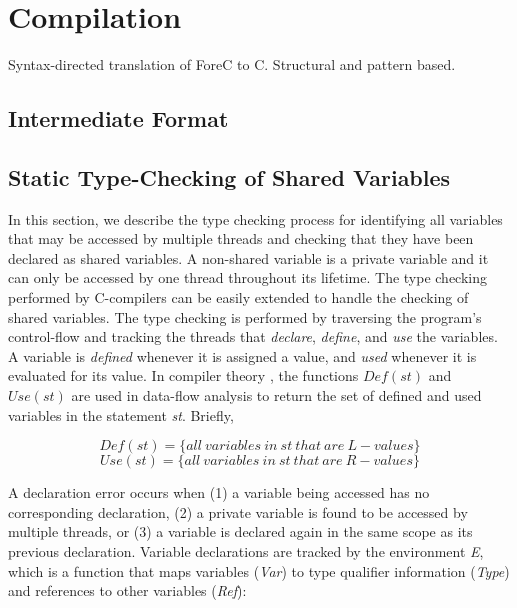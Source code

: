 \section{Compilation}
\label{sec:compilation}

Syntax-directed translation of ForeC to C. Structural and pattern based.

\subsection{Intermediate Format}

\subsection{Static Type-Checking of Shared Variables}
In this section, we describe the type checking process for identifying 
all variables that may be accessed by multiple threads and checking that 
they have been declared as shared variables. A non-shared variable is 
a private variable and it can only be accessed by one thread throughout 
its lifetime. The type checking performed by C-compilers can be easily 
extended to handle the checking of shared variables. The type checking 
is performed by traversing the program's control-flow and tracking the 
threads that \emph{declare}, \emph{define}, and \emph{use} the variables. 
A variable is \emph{defined} whenever it is assigned a value, and \emph{used} 
whenever it is evaluated for its value. In compiler theory \cite{compiler_def_use}, 
the functions $Def(st)$ and $Use(st)$ are used in data-flow analysis to 
return the set of defined and used variables in the statement \emph{st}. 
Briefly,

\begin{equation*}
	Def(st) = \{ all~variables~in~st~that~are~L-values \}
\end{equation*}
\begin{equation*}
	Use(st) = \{ all~variables~in~st~that~are~R-values \}
\end{equation*}

A declaration error occurs when (1) a variable being accessed has no 
corresponding declaration, (2) a private variable is found to be accessed 
by multiple threads, or (3) a variable is declared again in the same scope 
as its previous declaration. 
Variable declarations are tracked by the environment \emph{E}, which is 
a function that maps variables (\emph{Var}) to type qualifier information 
(\emph{Type}) and references to other variables (\emph{Ref}): 


